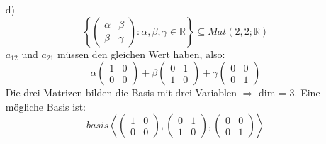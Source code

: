 \documentclass{article}
\begin{document}
\begin{enumerate}
        \item[d)]\[\left\{\left(\begin{array}{cc}\alpha&\beta\\\beta&\gamma\end{array}\right)
        :\alpha,\beta,\gamma\in\mathbb{R}\right\}\subseteq Mat(2,2;\mathbb{R})\]
        \newline
        $a_{12}$ und $a_{21}$ müssen den gleichen Wert haben, also:
        \newline
        \[\alpha\left(\begin{array}{cc}1&0\\0&0\end{array}\right)+
        \beta\left(\begin{array}{cc}0&1\\1&0\end{array}\right)+
        \gamma\left(\begin{array}{cc}0&0\\0&1\end{array}\right)\]
        \newline
        Die drei Matrizen bilden die Basis mit drei Variablen $\Rightarrow$ dim = 3. Eine mögliche Basis ist:
        \[basis\left<\left(\begin{array}{cc}1&0\\0&0\end{array}\right),
        \left(\begin{array}{cc}0&1\\1&0\end{array}\right),
        \left(\begin{array}{cc}0&0\\0&1\end{array}\right)\right>\]


\end{enumerate}
\end{document}
